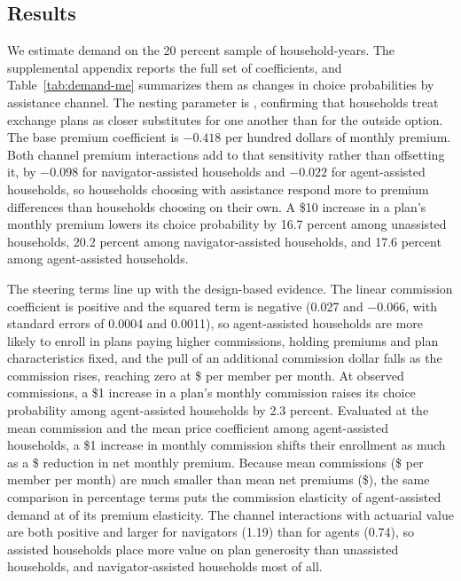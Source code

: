 \documentclass[12pt]{article}
\begin{document}
\subsection{Results}
\label{subsec:structural-results}

We estimate demand on the 20 percent sample of \nDemandHH{} household-years. The supplemental appendix reports the full set of coefficients, and Table~\ref{tab:demand-me} summarizes them as changes in choice probabilities by assistance channel. The nesting parameter is \lambdaHat{}, confirming that households treat exchange plans as closer substitutes for one another than for the outside option. The base premium coefficient is $-0.418$ per hundred dollars of monthly premium. Both channel premium interactions add to that sensitivity rather than offsetting it, by $-0.098$ for navigator-assisted households and $-0.022$ for agent-assisted households, so households choosing with assistance respond more to premium differences than households choosing on their own. A \$10 increase in a plan's monthly premium lowers its choice probability by 16.7 percent among unassisted households, 20.2 percent among navigator-assisted households, and 17.6 percent among agent-assisted households.

The steering terms line up with the design-based evidence. The linear commission coefficient is positive and the squared term is negative (0.027 and $-0.066$, with standard errors of 0.0004 and 0.0011), so agent-assisted households are more likely to enroll in plans paying higher commissions, holding premiums and plan characteristics fixed, and the pull of an additional commission dollar falls as the commission rises, reaching zero at \$\commTurningPoint{} per member per month. At observed commissions, a \$1 increase in a plan's monthly commission raises its choice probability among agent-assisted households by 2.3 percent. Evaluated at the mean commission and the mean price coefficient among agent-assisted households, a \$1 increase in monthly commission shifts their enrollment as much as a \$\commPremRatio{} reduction in net monthly premium. Because mean commissions (\$\meanCommission{} per member per month) are much smaller than mean net premiums (\$\meanNetPremium{}), the same comparison in percentage terms puts the commission elasticity of agent-assisted demand at \commPremElast{} of its premium elasticity. The channel interactions with actuarial value are both positive and larger for navigators (1.19) than for agents (0.74), so assisted households place more value on plan generosity than unassisted households, and navigator-assisted households most of all.
\end{document}
